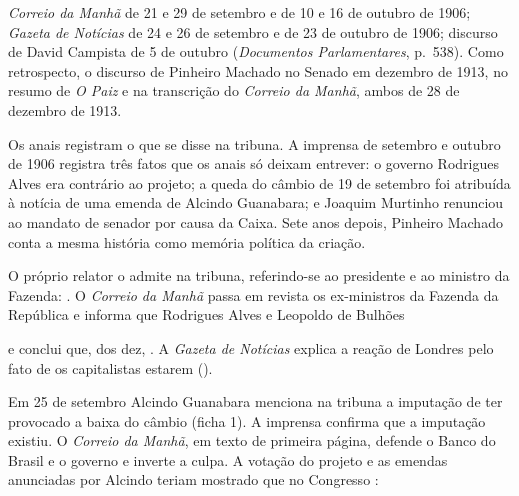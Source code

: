 

\textit{Correio da Manhã} de 21 e 29 de setembro e de 10 e 16 de outubro de
1906; \textit{Gazeta de Notícias} de 24 e 26 de setembro e de 23 de outubro de
1906; discurso de David Campista de 5 de outubro (\textit{Documentos
Parlamentares}, p.~538). Como retrospecto, o discurso de Pinheiro Machado no
Senado em dezembro de 1913, no resumo de \textit{O Paiz} e na transcrição do
\textit{Correio da Manhã}, ambos de 28 de dezembro de 1913.


Os anais registram o que se disse na tribuna. A imprensa de setembro e outubro
de 1906 registra três fatos que os anais só deixam entrever: o governo
Rodrigues Alves era contrário ao projeto; a queda do câmbio de 19 de setembro
foi atribuída à notícia de uma emenda de Alcindo Guanabara; e Joaquim Murtinho
renunciou ao mandato de senador por causa da Caixa. Sete anos depois, Pinheiro
Machado conta a mesma história como memória política da criação.


O próprio relator o admite na tribuna, referindo-se ao presidente e ao ministro
da Fazenda:  . O \textit{Correio da Manhã} passa em revista os
ex-ministros da Fazenda da República e informa que Rodrigues Alves e Leopoldo de
Bulhões


e conclui que, dos dez, . A \textit{Gazeta de Notícias} explica a reação de Londres pelo fato
de os capitalistas estarem 
().


Em 25 de setembro Alcindo Guanabara menciona na tribuna a imputação de ter
provocado a baixa do câmbio (ficha 1). A imprensa confirma que a imputação
existiu. O \textit{Correio da Manhã}, em texto de primeira página, defende o
Banco do Brasil e o governo e inverte a culpa. A votação do projeto e as
emendas anunciadas por Alcindo teriam mostrado que no Congresso
:

